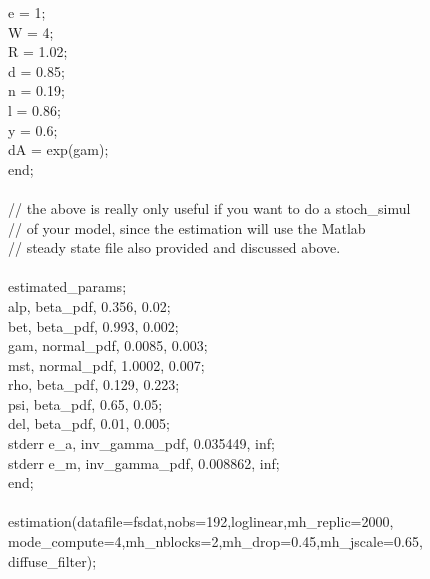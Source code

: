 {e = 1;\\
W = 4;\\
R = 1.02;\\
d = 0.85;\\
n = 0.19;\\
l = 0.86;\\
y = 0.6;\\
dA = exp(gam);\\
end;\\
\\
// the above is really only useful if you want to do a stoch\_simul\\
// of your model, since the estimation will use the Matlab\\
// steady state file also provided and discussed above.\\
\\
estimated\_params;\\
alp, beta\_pdf, 0.356, 0.02; \\ 
bet, beta\_pdf, 0.993, 0.002; \\
gam, normal\_pdf, 0.0085, 0.003; \\
mst, normal\_pdf, 1.0002, 0.007; \\
rho, beta\_pdf, 0.129, 0.223;\\
psi, beta\_pdf, 0.65, 0.05;\\
del, beta\_pdf, 0.01, 0.005;\\
stderr e\_a, inv\_gamma\_pdf, 0.035449, inf;\\
stderr e\_m, inv\_gamma\_pdf, 0.008862, inf;\\
end;\\
\\
estimation(datafile=fsdat,nobs=192,loglinear,mh\_replic=2000,\\
mode\_compute=4,mh\_nblocks=2,mh\_drop=0.45,mh\_jscale=0.65,\\
diffuse\_filter);}\\
\\

